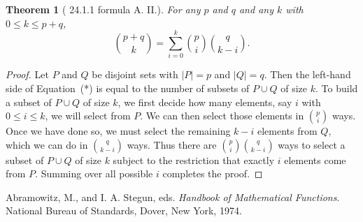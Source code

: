 \documentclass[12pt]{article}
\newtheorem{Theorem}{Theorem}
\begin{document}
\begin{Theorem}[\cite{AS} 24.1.1 formula A. II.]
For any $p$ and $q$ and any $k$ with $0\le k\le p+q$,
\begin{equation}
\binom{p+q}{k}=\sum_{i=0}^k\binom{p}{i}\binom{q}{k-i}.\tag{*}
\end{equation}
\end{Theorem}

\begin{proof}
Let $P$ and $Q$ be disjoint sets with $|P|=p$ and $|Q|=q$.  Then the 
left-hand side
of Equation~(*) is equal to the number of subsets of $P\cup Q$ of size $k$.
To build a subset of $P\cup Q$ of size $k$, we first decide how many elements, say $i$ with $0\le i\le k$,
we will select from $P$.  We can then select those elements in $\binom{p}{i}$
ways.  Once we have done so, we must select the
remaining $k-i$ elements from $Q$, which we can do in $\binom{q}{k-i}$ ways.  Thus there are $\binom{p}{i}\binom{q}{k-i}$ ways to select a subset of $P\cup Q$ of size $k$ subject to the restriction that exactly $i$ elements come from $P$.  Summing over all possible $i$ completes the proof.
\end{proof}

\begin{thebibliography}{9}
Abramowitz, M., and I. A. Stegun, eds.  {\it Handbook of Mathematical Functions}.  National Bureau of Standards, Dover, New York, 1974.
\end{thebibliography}
\end{document}
